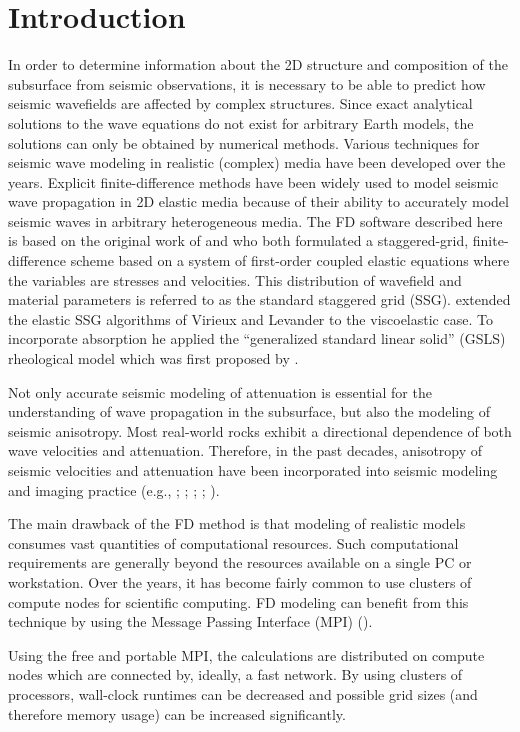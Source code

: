 \section{Introduction}
\label{intro}
In order to determine information about the 2D structure and composition of the subsurface from seismic observations, it is necessary to be able to predict how seismic wavefields are affected by complex structures. Since exact analytical solutions to the wave equations do not exist for arbitrary Earth models, the solutions can only be obtained by numerical methods. Various techniques for seismic wave modeling in realistic (complex) media have been developed over the years. Explicit finite-difference methods have been widely used to model seismic wave propagation in 2D elastic media because of their ability to accurately model seismic waves in arbitrary heterogeneous media. The FD software described here is based on the original work of \citet{virieux:86} and \citet{levander:88} who both formulated a staggered-grid, finite-difference scheme based on a system of first-order coupled elastic equations where the variables are stresses and velocities. This distribution of wavefield and material parameters is referred to as the standard staggered grid (SSG). \citet{robertsson:94} extended the elastic SSG algorithms of Virieux and Levander to the viscoelastic case. To incorporate absorption he applied the \enquote{generalized standard linear solid} (GSLS) rheological model which was first proposed by \citet{emmerich:87}.

Not only accurate seismic modeling of attenuation is essential for the understanding of wave propagation in the subsurface, but also the modeling of seismic anisotropy. Most real-world rocks exhibit a directional dependence of both wave velocities and attenuation. Therefore, in the past decades, anisotropy of seismic velocities and attenuation have been incorporated into seismic modeling and imaging practice (e.g., \cite{Carcione:88}; \cite{Komatitisch:99}; \cite{Thomsen:86}; \cite{Tsvankin:12}; \cite{Bai:16}).

The main drawback of the FD method is that modeling of realistic models consumes vast quantities of computational resources. Such computational requirements are generally beyond the resources available on a single PC or workstation. Over the years, it has become fairly common to use clusters of compute nodes for scientific computing. FD modeling can benefit from this technique by using the Message Passing Interface (MPI) (\cite{bohlen:02}). 

Using the free and portable MPI, the calculations are distributed on compute nodes which are connected by, ideally, a fast network. By using clusters of processors, wall-clock runtimes can be decreased and possible grid sizes (and therefore memory usage) can be increased significantly. 